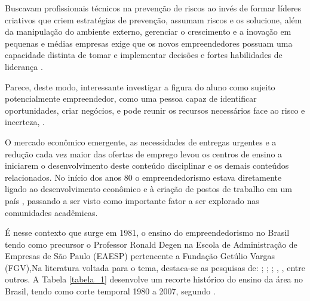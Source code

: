 Buscavam profissionais técnicos na prevenção de riscos ao invés de formar líderes criativos que criem estratégias de prevenção, assumam riscos \cite{sanna_evolution_1999} e os solucione, além da manipulação do ambiente externo, gerenciar o crescimento e a inovação em pequenas e médias empresas exige que os novos empreendedores possuam uma capacidade distinta de tomar e implementar decisões e fortes habilidades de liderança \cite{palmer_chip_2019}. 

Parece, deste modo, interessante investigar a figura do aluno como sujeito potencialmente empreendedor, como uma pessoa capaz de identificar oportunidades, criar negócios, e pode reunir os recursos necessários face ao risco e incerteza, \cite{pietrovski_alise_2019}.


O mercado econômico emergente, as necessidades de entregas urgentes e a redução cada vez maior das ofertas de emprego levou os centros de ensino a iniciarem o desenvolvimento deste conteúdo disciplinar e os demais conteúdos relacionados. No início dos anos 80 o empreendedorismo estava diretamente ligado ao desenvolvimento econômico e à criação de postos de trabalho em um país \cite{rodrigues_intencao_2019}, passando a ser visto como importante fator a ser explorado nas comunidades acadêmicas. 

É nesse contexto que surge em 1981, o ensino do empreendedorismo no Brasil tendo como precursor o Professor Ronald Degen \cite{degen_o_1989} na Escola de Administração de Empresas de São Paulo (EAESP) pertencente a Fundação Getúlio Vargas (FGV),Na literatura voltada para o tema, destaca-se as pesquisas de: ; ; ; , , entre outros. A Tabela \ref{tabela_1} desenvolve um recorte histórico do ensino da área no Brasil, tendo como corte temporal 1980 a 2007, segundo \cite{fernandes_breve_2013}. 



